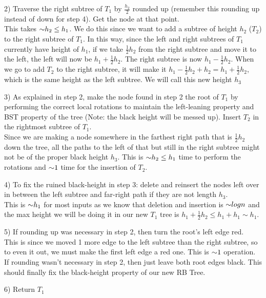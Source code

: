 \begin{problem}
\begin{questions}
2) Traverse the right subtree of $T_1$ by $\frac{h_2}{2}$ rounded up (remember this rounding up instead of down for step 4). Get the node at that point.\\
This takes $\mathord{\sim}h_2 \leq h_1$.
We do this since we want to add a subtree of height $h_2$ ($T_2$) to the right subtree of $T_1$.
In this way, since the left and right subtrees of $T_1$ currently have height of $h_1$, if we take $\frac{1}{2} h_2$ from the right subtree and move it to the left, the left will now be $h_1 + \frac{1}{2} h_2$.
The right subtree is now $h_1 - \frac{1}{2} h_2$. When we go to add $T_2$ to the right subtree, it will make it $h_1 - \frac{1}{2} h_2 + h_2 = h_1 + \frac{1}{2} h_2$, which is the same height as the left subtree.
We will call this new height $h_3$

3) As explained in step 2, make the node found in step 2 the root of $T_1$ by performing the correct local rotations to maintain the left-leaning property and BST property of the tree (Note: the black height will be messed up). Insert $T_2$ in the rightmost subtree of $T_1$.\\
Since we are making a node somewhere in the farthest right path that is $\frac{1}{2} h_2$ down the tree, all the paths to the left of that but still in the right subtree might not be of the proper black height $h_3$.
This is $\mathord{\sim}h_2 \leq h_1$ time to perform the rotations and $\mathord{\sim}1$ time for the insertion of $T_2$. 

4) To fix the ruined black-height in step 3: delete and reinsert the nodes left over in between the left subtree and far-right path if they are not length $h_3$.\\
This is $\mathord{\sim}h_1$ for most inputs as we know that deletion and insertion is $\mathord{\sim}log n$ and the max height we will be doing it in our new $T_1$ tree is $h_1 + \frac{1}{2} h_2 \leq h_1 + h_1 \sim h_1$.

5) If rounding up was necessary in step 2, then turn the root's left edge red.\\
This is since we moved 1 more edge to the left subtree than the right subtree, so to even it out, we must make the first left edge a red one. This is $\mathord{\sim}1$ operation.
If rounding wasn't necessary in step 2, then just leave both root edges black.
This should finally fix the black-height property of our new RB Tree.

6) Return $T_1$\\

\end{questions}
\end{problem}


